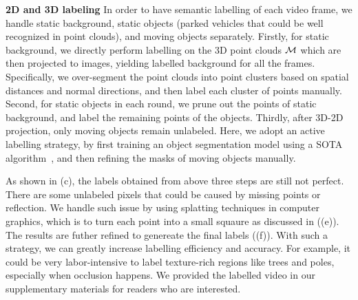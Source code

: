 \textbf{2D and 3D labeling}
In order to have semantic labelling of each video frame, we handle static background, static objects (\eg parked vehicles that could be well recognized in point clouds), and moving objects separately.
Firstly, for static background, we directly perform labelling on the 3D point clouds ${\mathcal M}$ which are then projected to images, yielding labelled background for all the frames.
Specifically, we over-segment the point clouds into point clusters based on spatial distances and normal directions, and then label each cluster of points manually.
Second, for static objects in each round, we prune out the points of static background, and label the remaining points of the objects.
Thirdly, after 3D-2D projection, only moving objects remain unlabeled. Here, we adopt an active labelling strategy, by first training an object segmentation model using a SOTA algorithm~\cite{WuSH16e}, and then refining the masks of moving objects manually.

As shown in (c), the labels obtained from above three steps are still not perfect. There are some unlabeled pixels that could be caused by missing points or reflection. We handle such issue by using splatting techniques in computer graphics, which is to turn each point into a small squaure as discussed in  ((e)). The results are futher refined to genereate the final labels ((f)).
With such a strategy, we can greatly increase labelling efficiency and accuracy. For example, it could be very labor-intensive to label texture-rich regions like trees and poles, especially when occlusion happens.
We provided the labelled video in our supplementary materials for readers who are interested.

